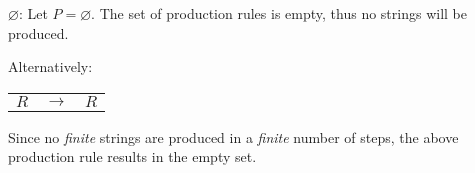 $\varnothing$: Let $P = \varnothing$. The set of production rules is empty, thus no strings will be produced. \par
Alternatively: \par
\begin{tabular}{ccl}
	$R$ & $\rightarrow$ & $R$ \\
\end{tabular} \par
Since no \emph{finite} strings are produced in a \emph{finite} number of steps, the above production rule results in the empty set.